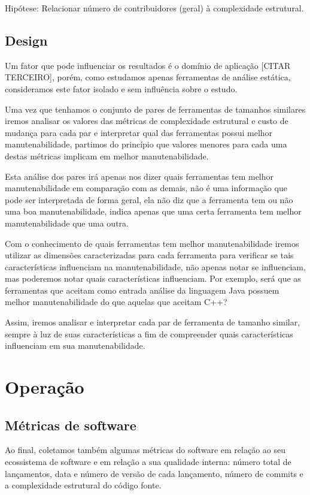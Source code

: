 Hipótese: Relacionar número de contribuidores (geral) à complexidade estrutural.

\subsection{Design}

Um fator que pode influenciar os resultados é o domínio de aplicação [CITAR TERCEIRO], 
porém, como estudamos apenas ferramentas de análise estática, consideramos este fator
isolado e sem influência sobre o estudo.

Uma vez que tenhamos o conjunto de pares de ferramentas de tamanhos similares
iremos analisar os valores das métricas de complexidade estrutural e custo de
mudança para cada par e interpretar qual das ferramentas possui melhor
manutenabilidade, partimos do princípio que valores menores para cada uma
destas métricas implicam em melhor manutenabilidade.

Esta análise dos pares irá apenas nos dizer quais ferramentas tem melhor
manutenabilidade em comparação com as demais, não é uma informação que
pode ser interpretada de forma geral, ela não diz que a ferramenta tem
ou não uma boa manutenabilidade, indica apenas que uma certa ferramenta
tem melhor manutenabilidade que uma outra.

Com o conhecimento de quais ferramentas tem melhor manutenabilidade iremos
utilizar as dimensões caracterizadas para cada ferramenta para verificar se
tais características influenciam na manutenabilidade, não apenas notar se
influenciam, mas poderemos notar quais características influenciam. Por
exemplo, será que as ferramentas que aceitam como entrada análise da linguagem
Java possuem melhor manutenabilidade do que aquelas que aceitam C++?

Assim, iremos analisar e interpretar cada par de ferramenta de tamanho
similar, sempre à luz de suas características a fim de compreender quais
características influenciam em sua manutenabilidade.


\section{Operação} 

\subsection{Métricas de software}

Ao final, coletamos também algumas métricas do software em relação ao seu
ecossistema de software e em relação a sua qualidade interna: número
total de lançamentos, data e número de versão de cada lançamento, número de
commits e a complexidade estrutural do código fonte.

